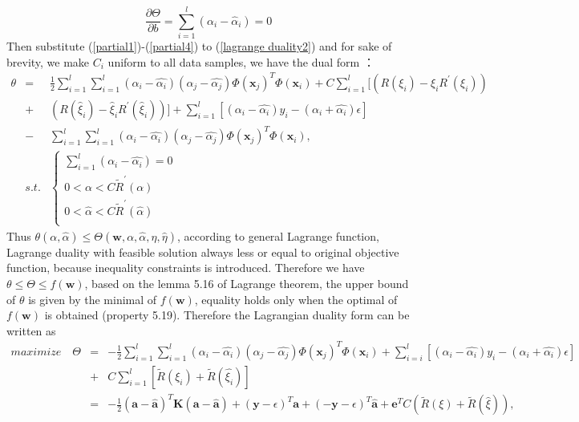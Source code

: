 \documentclass[12pt, draftclsnofoot, onecolumn]{IEEEtran}
\begin{document}
\begin{equation}
\frac{\partial \Theta}{\partial b}=\sum_{i=1}^{l}(\alpha_{i}-\hat{\alpha}_{i})=0
\label{partial4}
\end{equation} 
Then substitute (\ref{partial1})-(\ref{partial4}) to (\ref{lagrange duality2}) and for sake of brevity, we make $C_{i}$ uniform to all data samples, we have the dual form ：
\begin{eqnarray}
\nonumber
\theta &=&\frac{1}{2}\sum_{i=1}^{l}\sum_{i=1}^{l}(\alpha_{i}-\hat{\alpha_{i}})(\alpha_{j}-\hat{\alpha_{j}})\Phi(\mathbf{x}_{j})^{T}\Phi(\mathbf{x}_{i})+C\sum_{i=1}^{l}[(R(\xi_{i})-\xi_{i}R^{'}(\xi_{i}))\\
\nonumber
&+&(R(\hat{\xi}_{i})-\hat{\xi}_{i}R^{'}(\hat{\xi}_{i}))]
+\sum_{i=1}^{l}[(\alpha_{i}-\hat{\alpha_{i}})y_{i}-(\alpha_{i}+\hat{\alpha_{i}})\epsilon]\\
\nonumber
&-&\sum_{i=1}^{l}\sum_{i=1}^{l}(\alpha_{i}-\hat{\alpha_{i}})(\alpha_{j}-\hat{\alpha_{j}})\Phi(\mathbf{x}_{j})^{T}\Phi(\mathbf{x}_{i}),\\
&s.t.&\left\{\begin{array}{l}
\sum_{i=1}^{l}(\alpha_{i}-\hat{\alpha_{i}})=0\\
0<\alpha<C\tilde{R}^{'}(\alpha)\\
0<\hat{\alpha}<C\tilde{R}^{'}(\hat{\alpha})\\
\end{array}\right.
\label{dual objective function1}
\end{eqnarray}
Thus $\theta(\alpha,\hat{\alpha})\leq \Theta(\mathbf{w},\alpha, \hat{\alpha}, \eta, \hat{\eta})$, according to general Lagrange function\cite{introduction to SVM}, Lagrange duality with feasible solution always less or equal to original objective function, because inequality constraints is introduced. Therefore we have $\theta\leq \Theta \leq f(\mathbf{w})$, based on the lemma 5.16 of Lagrange theorem\cite{introduction of SVM}, the upper bound of $\theta$ is given by the minimal of $f(\mathbf{w})$, equality holds only when the optimal of $f(\mathbf{w})$ is obtained (property 5.19).
Therefore the Lagrangian duality form can be written as 
\begin{eqnarray}
\nonumber
maximize\quad \Theta &=&-\frac{1}{2}\sum_{i=1}^{l}\sum_{i=1}^{l}(\alpha_{i}-\hat{\alpha_{i}})(\alpha_{j}-\hat{\alpha_{j}})\Phi(\mathbf{x}_{j})^{T}\Phi(\mathbf{x}_{i})+\sum_{i=i}^{l}[(\alpha_{i}-\hat{\alpha_{i}})y_{i}-(\alpha_{i}+\hat{\alpha_{i}})\epsilon]\\
\nonumber
&+&C\sum_{i=1}^{l}[\tilde{R}(\xi_{i})+\tilde{R}(\hat{\xi_{i}})]\\
&=&-\frac{1}{2}(\mathbf{a}-\mathbf{\hat{a}})^{T}\mathbf{K}(\mathbf{a}-\mathbf{\hat{a}})+(\mathbf{y}-\epsilon)^{T}\mathbf{a}+(-\mathbf{y}-\epsilon)^{T}\mathbf{\hat{a}}+\mathbf{e}^{T}C(\tilde{R}(\xi)+\tilde{R}(\hat{\xi})),
\label{dual optimization function2}
\end{eqnarray}
\end{document}
